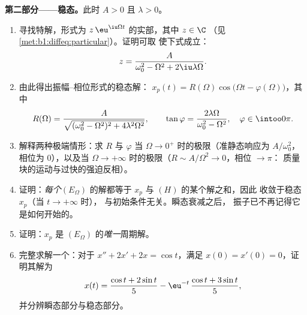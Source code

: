 \begin{problem}
\medskip
\noindent\textbf{第二部分——稳态。}此时 $A > 0$ 且
$\lambda > 0$。
\begin{enumerate}[resume]
  \item 寻找特解，形式为
        $z\,\eu^{\iu\Omega t}$ 的实部，其中 $z \in \C$
        （见\cref{met:b1:diffeq:particular}）。证明可取
        使下式成立：
        \[
        z = \frac{A}{\omega_0^2 - \Omega^2 + 2\iu\lambda\Omega} .
        \]
  \item 由此得出振幅--相位形式的稳态解：
        $x_p(t) = R(\Omega)\cos\bigl(\Omega t -
        \varphi(\Omega)\bigr)$，其中
        \[
        R(\Omega) = \frac{A}{\sqrt{(\omega_0^2 - \Omega^2)^2 +
        4\lambda^2\Omega^2}},
        \qquad
        \tan\varphi = \frac{2\lambda\Omega}{\omega_0^2 -
        \Omega^2},
        \quad \varphi \in \intoo0\pi .
        \]
  \item 解释两种极端情形：求
        $R$ 与 $\varphi$ 当 $\Omega \to 0^+$ 时的极限（准静态响应为
        $A/\omega_0^2$，相位为 $0$），以及当 $\Omega \to
        +\infty$ 时的极限（$R \sim A/\Omega^2 \to 0$，相位 $\to \pi$：
        质量块的运动与过快的强迫反相）。
  \item 证明：\emph{每个}$(E_\Omega)$ 的解都等于 $x_p$
        与 $(H)$ 的某个解之和，因此
        收敛于稳态 $x_p$（当 $t \to +\infty$ 时），
        与初始条件无关。瞬态衰减之后，
        振子已不再记得它是如何开始的。
  \item 证明：$x_p$ 是
        $(E_\Omega)$ 的\emph{唯一}周期解。
  \item 完整求解一个：对于 $x'' + 2x' + 2x =
        \cos t$，满足 $x(0) = x'(0) = 0$，证明其解为
        \[
        x(t) = \frac{\cos t + 2\sin t}5
        - \eu^{-t}\,\frac{\cos t + 3\sin t}5 ,
        \]
        并分辨瞬态部分与稳态部分。
\end{enumerate}


\end{problem}
